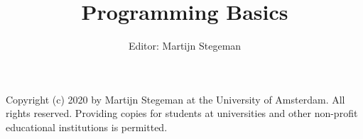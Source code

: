 \def\doclang{english}
\def\langdir{en}




    \title{Programming Basics}
    \author{Editor: Martijn Stegeman}
    \maketitle

    Copyright (c) 2020 by Martijn Stegeman at the University of Amsterdam. All rights reserved. Providing copies for students at universities and other non-profit educational institutions is permitted.

